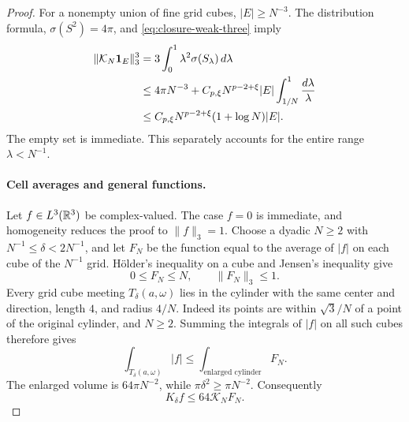 \begin{proof}
For a nonempty union of fine grid cubes, \(|E|\ge N^{-3}\).  The
distribution formula, \(\sigma(S^2)=4\pi\), and
\eqref{eq:closure-weak-three} imply
\begin{align}
  \|\mathcal K_N\mathbf 1_E\|_3^3
    &=3\int_0^1\lambda^2\sigma(S_\lambda)\,d\lambda \notag\\
    &\le4\pi N^{-3}
          +C_{p,\xi}N^{p-2+\xi}|E|
                                  \int_{1/N}^1\frac{d\lambda}{\lambda}
       \notag\\
    &\le C_{p,\xi}N^{p-2+\xi}(1+\log N)|E|.
    \label{eq:closure-indicator-strong}
\end{align}
The empty set is immediate.  This separately accounts for the entire
range \(\lambda<N^{-1}\).

\paragraph{Cell averages and general functions.}
Let \(f\in L^3(\mathbb R^3)\) be complex-valued.  The case \(f=0\) is
immediate, and homogeneity reduces the proof to \(\|f\|_3=1\).
Choose a dyadic \(N\ge2\) with
\(N^{-1}\le\delta<2N^{-1}\), and let \(F_N\) be the function equal
to the average of \(|f|\) on each cube of the \(N^{-1}\) grid.
Hölder's inequality on a cube and Jensen's inequality give
\begin{equation}
  0\le F_N\le N,\qquad \|F_N\|_3\le1.
  \label{eq:closure-cell-averages}
\end{equation}
Every grid cube meeting \(T_\delta(a,\omega)\) lies in the cylinder
with the same center and direction, length \(4\), and radius \(4/N\).
Indeed its points are within \(\sqrt3/N\) of a point of the original
cylinder, and \(N\ge2\).  Summing the integrals of \(|f|\) on all
such cubes therefore gives
\[
  \int_{T_\delta(a,\omega)}|f|
       \le\int_{\text{enlarged cylinder}}F_N.
\]
The enlarged volume is \(64\pi N^{-2}\), while
\(\pi\delta^2\ge\pi N^{-2}\).  Consequently
\begin{equation}
  K_\delta f\le64\mathcal K_N F_N.
  \label{eq:closure-enlargement}
\end{equation}


\end{proof}
